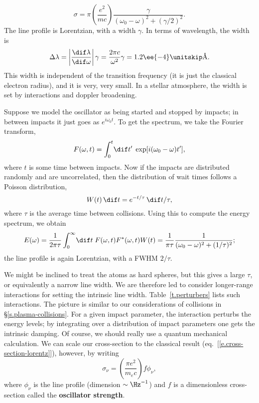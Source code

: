 \begin{equation}\label{e.cross-section-lorentz}
	\sigma = \pi\left(\frac{e^{2}}{mc}\right)\frac{\gamma}{(\omega_{0}-\omega)^{2} + (\gamma/2)^{2}}.
\end{equation}
The line profile is Lorentzian, with a width $\gamma$. In terms of wavelength, the width is
\[ 
	\Delta \lambda = \left|\frac{\dif\lambda}{\dif\omega}\right|\gamma = \frac{2\pi c}{\omega^{2}}\gamma
	= 1.2\ee{-4}\nsp\textrm{\AA}.
\]
This width is independent of the transition frequency (it is just the classical electron radius), and it is very, very small.  In a stellar atmosphere, the width is set by interactions and doppler broadening.

Suppose we model the oscillator as being started and stopped by impacts; in between impacts it just goes as $e^{i\omega_{0}t}$.  To get the spectrum, we take the Fourier transform,
\[
	F(\omega,t) = \int_{0}^{t}\!\dif t'\; \exp[i(\omega_{0}-\omega)t'],
\]
where $t$ is some time between impacts. Now if the impacts are distributed randomly and are uncorrelated, then the distribution of wait times follows a Poisson distribution,
\[ W(t)\,\dif t = e^{-t/\tau}\,\dif t/\tau, \]
where $\tau$ is the average time between collisions.  Using this to compute the energy spectrum, we obtain
\[ E(\omega) = \frac{1}{2\pi\tau}\int_{0}^{\infty}\!\dif t\; F(\omega,t)F^{*}(\omega,t)W(t) = \frac{1}{\pi\tau} 
	\frac{1}{(\omega_{0}-\omega)^{2} + (1/\tau)^{2}};
\]
the line profile is again Lorentzian, with a FWHM $2/\tau$.

We might be inclined to treat the atoms as hard spheres, but this gives a large $\tau$, or equivalently a narrow line width. We are therefore led to consider longer-range interactions for setting the intrinsic line width. Table~\ref{t.perturbers} lists such interactions. The picture is similar to our considerations of collisions in \S\ref{s.plasma-collisions}. For a given impact parameter, the interaction perturbs the energy levels; by integrating over a distribution of  impact parameters one gets the intrinsic damping. Of course, we should really use a quantum mechanical calculation.  We can scale our cross-section to the classical result (eq.~[\ref{e.cross-section-lorentz}]), however, by writing
\begin{equation}\label{e.cross-section}
	 \sigma_{\nu} = \left(\frac{\pi e^{2}}{m_{e}c}\right) f \phi_{\nu}, 
\end{equation}
where $\phi_{\nu}$ is the line profile (dimension $\sim \Hz^{-1}$) and $f$ is a dimensionless cross-section called the \textbf{oscillator strength}.

